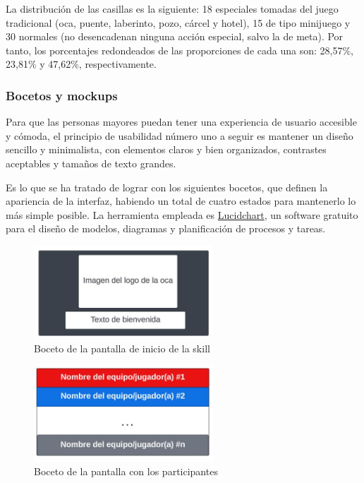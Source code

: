 La distribución de las casillas es la siguiente: 18 especiales tomadas del juego tradicional (oca, puente, laberinto, pozo, cárcel y hotel), 15 de tipo minijuego y 30 normales (no desencadenan ninguna acción especial, salvo la de meta). Por tanto, los porcentajes redondeados de las proporciones de cada una son: 28,57\%, 23,81\% y 47,62\%, respectivamente. 

\subsubsection{Bocetos y mockups}

Para que las personas mayores puedan tener una experiencia de usuario accesible y cómoda, el principio de usabilidad número uno a seguir es mantener un diseño sencillo y minimalista, con elementos claros y bien organizados, contrastes aceptables y tamaños de texto grandes. 

Es lo que se ha tratado de lograr con los siguientes bocetos, que definen la apariencia de la interfaz, habiendo un total de cuatro estados para mantenerlo lo más simple posible. La herramienta empleada es \href{https://www.lucidchart.com/pages/es}{Lucidchart}, un software gratuito para el diseño de modelos, diagramas y planificación de procesos y tareas.

\begin{figure}[H]
    \centering
    \includegraphics[width=0.6\textwidth]{imgs/boceto-bienvenida.JPG}
    \caption{Boceto de la pantalla de inicio de la skill}
    \label{fig:boceto-bienvenida}
\end{figure}

\begin{figure}[H]
    \centering
    \includegraphics[width=0.6\textwidth]{imgs/boceto-fichas.JPG}
    \caption{Boceto de la pantalla con los participantes}
    \label{fig:boceto-fichas}
\end{figure}

